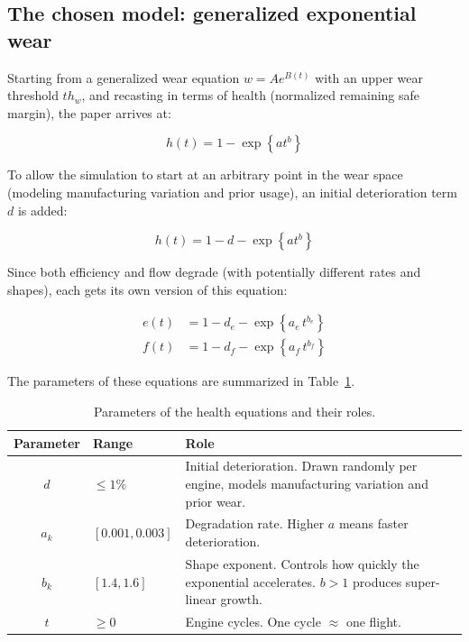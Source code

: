 \documentclass[11pt, a4paper]{article}
\begin{document}
\subsection{The chosen model: generalized exponential wear}

Starting from a generalized wear equation $w = Ae^{B(t)}$ with an
upper wear threshold $th_w$, and recasting in terms of health
(normalized remaining safe margin), the paper arrives at:

\begin{equation}
  h(t) = 1 - \exp\!\left\{a t^b\right\}
  \label{eq:health_basic}
\end{equation}

To allow the simulation to start at an arbitrary point in the wear
space (modeling manufacturing variation and prior usage), an initial
deterioration term $d$ is added:

\begin{equation}
  h(t) = 1 - d - \exp\!\left\{a t^b\right\}
  \label{eq:health_full}
\end{equation}

Since both efficiency and flow degrade (with potentially different rates
and shapes), each gets its own version of this equation:

\begin{align}
  e(t) &= 1 - d_e - \exp\!\left\{a_e \, t^{b_e}\right\} \label{eq:eff} \\
  f(t) &= 1 - d_f - \exp\!\left\{a_f \, t^{b_f}\right\} \label{eq:flow}
\end{align}

The parameters of these equations are summarized in
Table~\ref{tab:params}.

\begin{table}[H]
  \centering
  \caption{Parameters of the health equations and their roles.}
  \label{tab:params}
  \begin{tabular}{@{}clp{7.5cm}@{}}
    \toprule
    Parameter & Range & Role \\
    \midrule
    $d$       & $\leq 1\%$ & Initial deterioration. Drawn randomly per engine,
                              models manufacturing variation and prior wear. \\
    $a_k$     & $[0.001, 0.003]$ & Degradation rate. Higher $a$ means faster
                                   deterioration. \\
    $b_k$     & $[1.4, 1.6]$ & Shape exponent. Controls how quickly the
                               exponential accelerates. $b > 1$ produces
                               super-linear growth. \\
    $t$       & $\geq 0$ & Engine cycles. One cycle $\approx$ one flight. \\
    \bottomrule
  \end{tabular}
\end{table}
\end{document}
